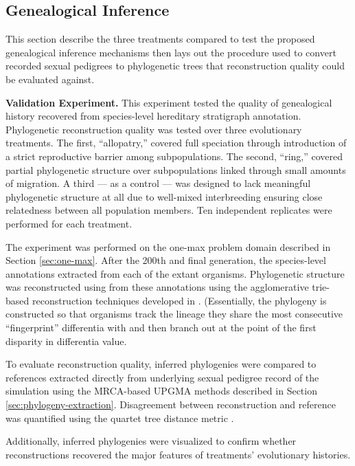 \subsection{Genealogical Inference}
\label{sec:genealogical-inference}

This section describe the three treatments compared to test the proposed genealogical inference mechanisms then lays out the procedure used to convert recorded sexual pedigrees to phylogenetic trees that reconstruction quality could be evaluated against.

\textbf{Validation Experiment.}
This experiment tested the quality of genealogical history recovered from species-level hereditary stratigraph annotation.
Phylogenetic reconstruction quality was tested over three evolutionary treatments.
The first, ``allopatry,'' covered full speciation through introduction of a strict reproductive barrier among subpopulations.
The second, ``ring,'' covered partial phylogenetic structure over subpopulations linked through small amounts of migration.
A third --- as a control --- was designed to lack meaningful phylogenetic structure at all due to well-mixed interbreeding ensuring close relatedness between all population members.
Ten independent replicates were performed for each treatment.

The experiment was performed on the one-max problem domain described in Section \ref{sec:one-max}.
After the 200th and final generation, the species-level annotations extracted from each of the extant organisms.
Phylogenetic structure was reconstructed using from these annotations using the agglomerative trie-based reconstruction techniques developed in \citep{moreno2023toward}.
(Essentially, the phylogeny is constructed so that organisms track the lineage they share the most consecutive ``fingerprint'' differentia with and then branch out at the point of the first disparity in differentia value.

To evaluate reconstruction quality, inferred phylogenies were compared to references extracted directly from underlying sexual pedigree record of the simulation using the MRCA-based UPGMA methods described in Section \ref{sec:phylogeny-extraction}.
Disagreement between reconstruction and reference was quantified using the quartet tree distance metric \citep{estabrook1985comparison}.

Additionally, inferred phylogenies were visualized to confirm whether reconstructions recovered the major features of treatments' evolutionary histories.

